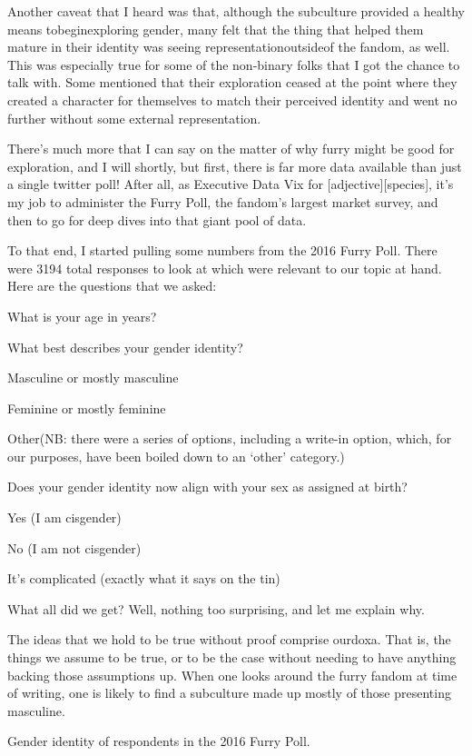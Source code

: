 Another caveat that I heard was that, although the subculture provided a healthy means tobeginexploring gender, many felt that the thing that helped them mature in their identity was seeing representationoutsideof the fandom, as well. This was especially true for some of the non-binary folks that I got the chance to talk with. Some mentioned that their exploration ceased at the point where they created a character for themselves to match their perceived identity and went no further without some external representation.

There's much more that I can say on the matter of why furry might be good for exploration, and I will shortly, but first, there is far more data available than just a single twitter poll! After all, as Executive Data Vix for {[}adjective{]}{[}species{]}, it's my job to administer the Furry Poll, the fandom's largest market survey, and then to go for deep dives into that giant pool of data.

To that end, I started pulling some numbers from the 2016 Furry Poll. There were 3194 total responses to look at which were relevant to our topic at hand. Here are the questions that we asked:

What is your age in years?

What best describes your gender identity?

Masculine or mostly masculine

Feminine or mostly feminine

Other(NB: there were a series of options, including a write-in option, which, for our purposes, have been boiled down to an `other' category.)

Does your gender identity now align with your sex as assigned at birth?

Yes (I am cisgender)

No (I am not cisgender)

It's complicated (exactly what it says on the tin)

What all did we get? Well, nothing too surprising, and let me explain why.

The ideas that we hold to be true without proof comprise ourdoxa. That is, the things we assume to be true, or to be the case without needing to have anything backing those assumptions up. When one looks around the furry fandom at time of writing, one is likely to find a subculture made up mostly of those presenting masculine.

Gender identity of respondents in the 2016 Furry Poll.

